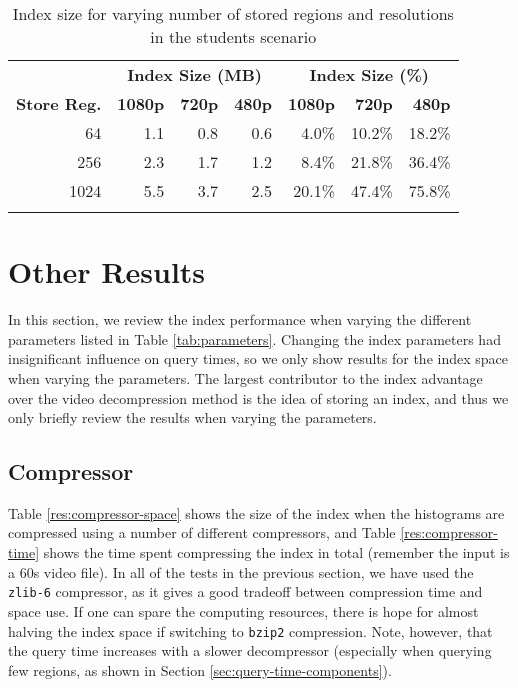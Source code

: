 \begin{table}[t]
    \caption{Index size for varying number of stored regions and resolutions in the students scenario}\label{res:regions-stored}
	\centering
    \begin{tabular}{r rrr rrr}
		~ & \multicolumn{3}{c|}{\textbf{Index Size (MB)}} & \multicolumn{3}{c}{\textbf{Index Size (\%)}} \\
		\cline{2-7}
	    \textbf{Store Reg.} & \textbf{1080p} & \textbf{720p} & \textbf{480p} & \textbf{1080p} & \textbf{720p} & \textbf{480p} \\ \hline\noalign{\smallskip}
		64   		& 1.1 & 0.8 & 0.6 		&  4.0\% & 10.2\% & 18.2\%        \\
	    256			& 2.3 & 1.7 & 1.2 		&  8.4\% & 21.8\% & 36.4\%        \\
	    1024     	& 5.5 & 3.7 & 2.5 		& 20.1\% & 47.4\% & 75.8\%        \\\noalign{\smallskip} 
        \hline
	   \end{tabular}
\end{table}

\section{Other Results}
In this section, we review the index performance when varying the different parameters listed in Table \ref{tab:parameters}. Changing the index parameters had insignificant influence on query times, so we only show results for the index space when varying the parameters. The largest contributor to the index advantage over the video decompression method is the idea of storing an index, and thus we only briefly review the results when varying the parameters.

\subsection*{Compressor}
Table \ref{res:compressor-space} shows the size of the index when the histograms are compressed using a number of different compressors, and Table \ref{res:compressor-time} shows the time spent compressing the index in total (remember the input is a 60s video file). In all of the tests in the previous section, we have used the \texttt{zlib-6} compressor, as it gives a good tradeoff between compression time and space use. If one can spare the computing resources, there is hope for almost halving the index space if switching to \texttt{bzip2} compression. Note, however, that the query time increases with a slower decompressor (especially when querying few regions, as shown in Section \ref{sec:query-time-components}).


